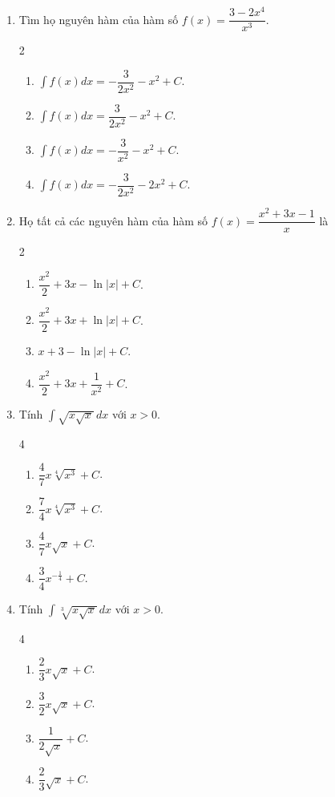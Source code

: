 \documentclass[12pt]{article}
\begin{document}
\begin{enumerate}[label=\textbf{Câu \arabic*.}]
		\item Tìm họ nguyên hàm của hàm số $f(x) = \dfrac{3 - 2x^4}{x^3}$.
		\begin{multicols}{2}
			\begin{enumerate}[label=\textbf{\Alph*.}]
				\item $\displaystyle \int f(x)dx = -\dfrac{3}{2x^2} - x^2 + C$.
				\item $\displaystyle \int f(x)dx = \dfrac{3}{2x^2} - x^2 + C$.
				\item $\displaystyle \int f(x)dx = -\dfrac{3}{x^2} - x^2 + C$.
				\item $\displaystyle \int f(x)dx = -\dfrac{3}{2x^2} - 2x^2 + C$.
			\end{enumerate}
		\end{multicols}
		
		\item Họ tất cả các nguyên hàm của hàm số $f(x) = \dfrac{x^2 + 3x - 1}{x}$ là
		\begin{multicols}{2}
			\begin{enumerate}[label=\textbf{\Alph*.}]
				\item $\dfrac{x^2}{2} + 3x - \ln|x| + C$.
				\item $\dfrac{x^2}{2} + 3x + \ln|x| + C$.
				\item $x + 3 - \ln|x| + C$.
				\item $\dfrac{x^2}{2} + 3x + \dfrac{1}{x^2} + C$.
			\end{enumerate}
		\end{multicols}
		
		\item Tính $\displaystyle \int \sqrt{x\sqrt{x}} \,dx$ với $x > 0$.
		\begin{multicols}{4}
			\begin{enumerate}[label=\textbf{\Alph*.}]
				\item $\dfrac{4}{7} x\sqrt[4]{x^3} + C$.
				\item $\dfrac{7}{4} x\sqrt[4]{x^3} + C$.
				\item $\dfrac{4}{7} x\sqrt{x} + C$.
				\item $\dfrac{3}{4} x^{-\frac{1}{4}} + C$.
			\end{enumerate}
		\end{multicols}
		
		\item Tính $\displaystyle \int \sqrt[3]{x\sqrt{x}} \,dx$ với $x > 0$.
		\begin{multicols}{4}
			\begin{enumerate}[label=\textbf{\Alph*.}]
				\item $\dfrac{2}{3} x\sqrt{x} + C$.
				\item $\dfrac{3}{2} x\sqrt{x} + C$.
				\item $\dfrac{1}{2\sqrt{x}} + C$.
				\item $\dfrac{2}{3} \sqrt{x} + C$.
			\end{enumerate}
		\end{multicols}
		

\end{enumerate}
\end{document}
